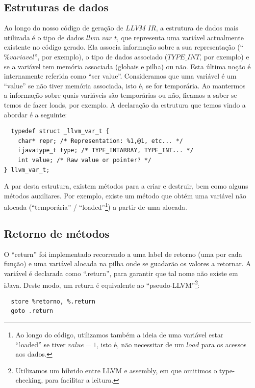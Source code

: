 \documentclass[11pt,a4paper]{article}
\begin{document}
\subsection{Estruturas de dados}

Ao longo do nosso código de geração de $LLVM$ $IR$, a estrutura de dados mais utilizada é o tipo de dados $llvm\_var\_t$, que representa uma variável actualmente existente no código gerado. Ela associa informação sobre a sua representação (``$\%variavel$'', por exemplo), o tipo de dados associado ($TYPE\_INT$, por exemplo) e se a variável tem memória associada (globais e pilha) ou não. Esta última noção é internamente referida como ``ser value''. Consideramos que uma variável é um ``value'' se não tiver memória associada, isto é, se for temporária. Ao mantermos a informação sobre quais variáveis são temporárias ou não, ficamos a saber se temos de fazer loads, por exemplo. A declaração da estrutura que temos vindo a abordar é a seguinte:

\begin{lstlisting}
  typedef struct _llvm_var_t {
    char* repr; /* Representation: %1,@1, etc... */
    ijavatype_t type; /* TYPE_INTARRAY, TYPE_INT... */
    int value; /* Raw value or pointer? */
} llvm_var_t;
\end{lstlisting}

A par desta estrutura, existem métodos para a criar e destruir, bem como alguns métodos auxiliares. Por exemplo, existe um método que obtém uma variável não alocada (``temporária'' / ``loaded''\footnote{Ao longo do código, utilizamos também a ideia de uma variável estar ``loaded'' se tiver $value = 1$, isto é, não necessitar de um $load$ para os acessos aos dados.}) a partir de uma alocada.

\subsection{Retorno de métodos}

O ``return'' foi implementado recorrendo a uma label de retorno (uma por cada função) e uma variável alocada na pilha onde se guadarão os valores a retornar. A variável é declarada como ``.return'', para garantir que tal nome não existe em iJava. Deste modo, um return é equivalente ao ``pseudo-LLVM''\footnote{Utilizamos um híbrido entre LLVM e assembly, em que omitimos o type-checking, para facilitar a leitura.}:

\begin{lstlisting}
  store %retorno, %.return
  goto .return
\end{lstlisting}
\end{document}
